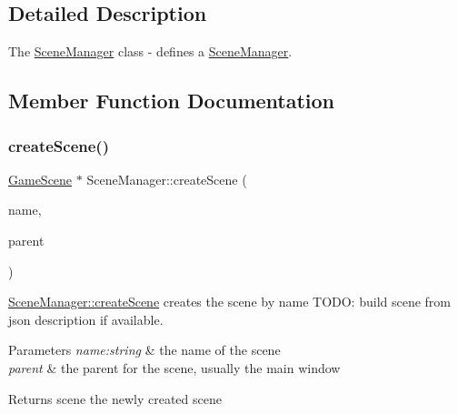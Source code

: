 \subsection{Detailed Description}
The \hyperlink{class_scene_manager}{Scene\+Manager} class -\/ defines a \hyperlink{class_scene_manager}{Scene\+Manager}. 

\subsection{Member Function Documentation}
\mbox{\label{class_scene_manager_ac862660ed44b8ab110dec97ec90a9bad}} 
\subsubsection{\texorpdfstring{create\+Scene()}{createScene()}}
{\footnotesize\ttfamily \hyperlink{class_game_scene}{Game\+Scene} $\ast$ Scene\+Manager\+::create\+Scene (\begin{DoxyParamCaption}\item[{const Q\+String \&}]{name,  }\item[{C\+Object $\ast$}]{parent }\end{DoxyParamCaption})}



\hyperlink{class_scene_manager_ac862660ed44b8ab110dec97ec90a9bad}{Scene\+Manager\+::create\+Scene} creates the scene by name T\+O\+DO\+: build scene from json description if available. 


\begin{DoxyParams}{Parameters}
{\em name\+:string} & the name of the scene \\
\hline
{\em parent} & the parent for the scene, usually the main window \\
\hline
\end{DoxyParams}
\begin{DoxyReturn}{Returns}
scene the newly created scene 
\end{DoxyReturn}

